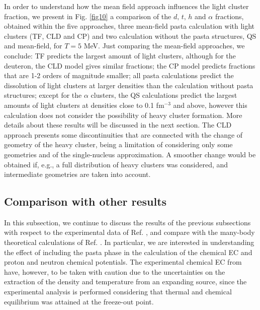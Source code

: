 \documentclass[aps,prc,nofootinbib,twocolumn,showpacs]{revtex4-1}
\begin{document}
 In order to
  understand how the mean field approach influences the light cluster fraction, we
present in Fig. \ref{fig10} a comparison of the $d,\, t,
\, h$ and $\alpha$ fractions, obtained within the five approaches, three
mean-field pasta calculation with light clusters (TF, CLD and CP) and
two calculation without the pasta structures, QS and mean-field,   for
$T=5$ MeV.  Just comparing the mean-field approaches, we conclude: TF
predicts the largest amount of light clusters,
although for the deuteron, the CLD model gives similar fractions;
 the CP model predicts fractions that are 1-2 orders of magnitude
 smaller; all pasta calculations predict the dissolution of light
 clusters at larger densities than the calculation without pasta
 structures; 
except for the $\alpha$ clusters, the QS calculations
 predict the largest amounts of light clusters at densities close to
 0.1 fm$^{-3}$ and above, however this calculation does not consider
 the possibility of heavy cluster formation. More details about these results will be
 discussed in the next section.  The CLD approach presents some
   discontinuities that are connected with the change of geometry of
   the heavy cluster,  being a limitation of considering only some
   geometries and of the single-nucleus approximation. A smoother change would be
obtained if, e.g., a full distribution of heavy clusters was
considered, and intermediate geometries are taken into account. 




\subsection{Comparison with other results}



In this subsection, we continue to discuss the results of the previous subsections with respect to the
experimental data of Ref. \cite{qin12}, and compare with the many-body theoretical
calculations of Ref. \cite{roepke15}. In particular, we are interested in
understanding the effect of including the pasta phase in the
calculation of the chemical EC  
and proton and neutron chemical potentials. The experimental  chemical EC 
from \cite{qin12} have, however, to be taken with caution due to the
uncertainties on the extraction of the density and temperature from an
expanding source, since the experimental analysis is performed
considering that  thermal and chemical equilibrium was attained at the freeze-out point.
\end{document}
